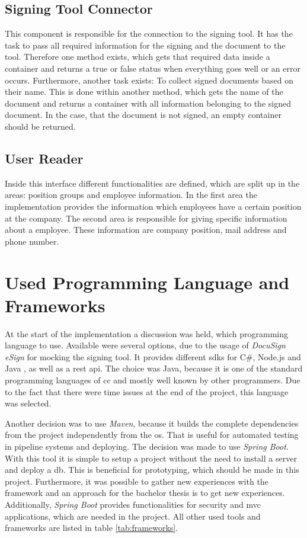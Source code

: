 \subsection*{Signing Tool Connector}
This component is responsible for the connection to the signing tool. It has the task to pass all required information for the signing and the document to the tool. Therefore one method exists, which gets that required data inside a container and returns a true or false status when everything goes well or an error occurs. \newline
Furthermore, another task exists: To collect signed documents based on their name. This is done within another method, which gets the name of the document and returns a container with all information belonging to the signed document. In the case, that the document is not signed, an empty container should be returned. 

\subsection*{User Reader}
Inside this interface different functionalities are defined, which are split up in the areas: position groups and employee information. In the first area the implementation provides the information which employees have a certain position at the company. The second area is responsible for giving specific information about a employee. These information are company position, mail address and phone number.

\section{Used Programming Language and Frameworks}
At the start of the implementation a discussion was held, which programming language to use. Available were several options, due to the usage of \textit{DocuSign eSign} for mocking the signing tool. It provides different \glspl{sdk} for C\#, Node.js and Java \parencite{docusign2018sdk}, as well as a \gls{rest} \gls{api}. The choice was Java, because it is one of the standard programming languages of \gls{cc} and mostly well known by other programmers. Due to the fact that there were time issues at the end of the project, this language was selected.

Another decision was to use \textit{Maven}, because it builds the complete dependencies from the project independently from the \gls{os}. That is useful for automated testing in pipeline systems and deploying. \newline
The decision was made to use \textit{Spring Boot}. With this tool it is simple to setup a project without the need to install a server and deploy a \gls{db}. This is beneficial for prototyping, which should be made in this project. Furthermore, it was possible to gather new experiences with the framework and an approach for the bachelor thesis is to get new experiences. Additionally, \textit{Spring Boot} provides functionalities for security and \gls{mvc} applications, which are needed in the project. \newline
All other used tools and frameworks are listed in table \ref{tab:frameworks}.


